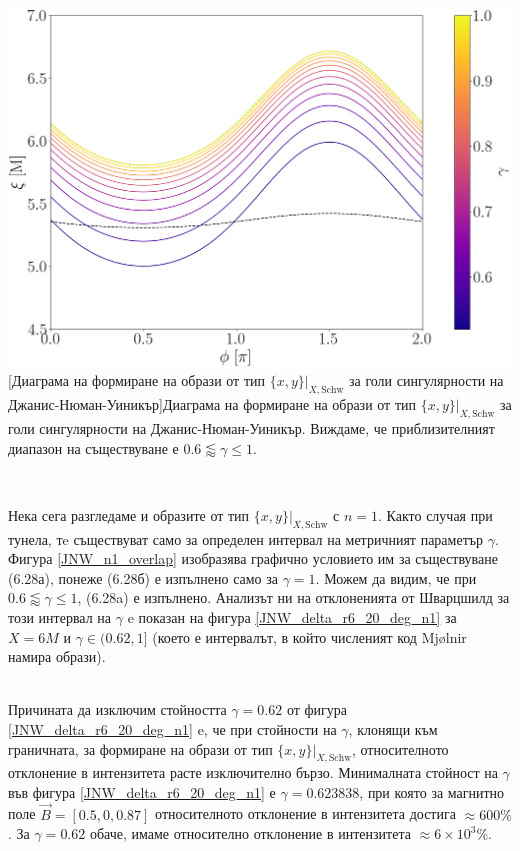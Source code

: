 \begin{minipage}{16em}
	\hspace{-0.3cm}
	\includegraphics[scale = 0.18]{JNW_indirect_overlap_grapth.png}
	[Диаграма на формиране на образи от тип $\{x,y\}\vert_{X, \text{Schw}}$ за голи сингулярности на Джанис-Нюман-Уиникър]{\small Диаграма на формиране на образи от тип $\{x,y\}\vert_{X, \text{Schw}}$ за голи сингулярности на Джанис-Нюман-Уиникър. Виждаме, че приблизителният диапазон на съществуване е $0.6 \lessapprox \gamma \le 1$.} 
	\label{JNW_n1_overlap}
\end{minipage}\,\,
\begin{minipage}{20em}
	Нека сега разгледаме и образите от тип $\{x,y\}\vert_{X, \text{Schw}}$ с $n = 1$. Както случая при тунела, тe съществуват само за определен интервал на метричният параметър $\gamma$. Фигура \ref{JNW_n1_overlap} изобразява графично условието им за съществуване (6.28а), понеже (6.28б) е изпълнено само за $\gamma = 1$. Можем да видим, че при  $0.6 \lessapprox \gamma \le 1$, (6.28a) е изпълнено. Анализът ни на отклоненията от Шварцшилд за този интервал на $\gamma$ e показан на фигура \ref{JNW_delta_r6_20_deg_n1} за $X = 6M$ и $\gamma\in(0.62, 1]$ (което е интервалът, в който численият код Mjølnir намира образи).
\end{minipage}\\

Причината да изключим стойността $\gamma = 0.62$ от фигура \ref{JNW_delta_r6_20_deg_n1} e, че при стойности на $\gamma$, клонящи към граничната, за формиране на образи от тип $\{x,y\}\vert_{X, \text{Schw}}$, относителното отклонение в интензитета расте изключително бързо. Минималната стойност на $\gamma$ във фигура \ref{JNW_delta_r6_20_deg_n1} е $\gamma = 0.623838$, при която за магнитно поле $\vec{B} = [0.5, 0, 0.87]$ относителното отклонение в интензитета достига $\approx 600\%$. За $\gamma = 0.62$ обаче, имаме относително отклонение в интензитета $\approx 6\times 10^3 \%$.\\

